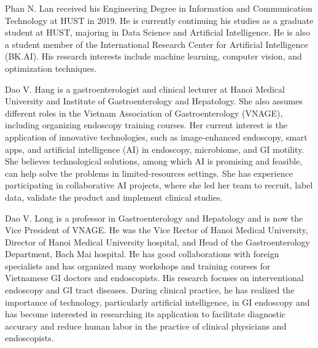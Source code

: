 \documentclass{ieeeaccess}
\begin{document}
\begin{IEEEbiography}{Phan N. Lan} received his Engineering Degree in Information and Communication Technology at HUST in 2019. He is currently continuing his studies as a graduate student at HUST, majoring in Data Science and Artificial Intelligence. He is also a student member of the International Research Center for Artificial Intelligence (BK.AI). His research interests include machine learning, computer vision, and optimization techniques.
    
\end{IEEEbiography}

\begin{IEEEbiography}{Dao V. Hang} is a gastroenterologist and clinical lecturer at Hanoi Medical University and Institute of Gastroenterology and Hepatology. She also assumes different roles in the Vietnam Association of Gastroenterology (VNAGE), including organizing endoscopy training courses. Her current interest is the application of innovative technologies, such as image-enhanced endoscopy, smart apps, and artificial intelligence (AI) in endoscopy, microbiome, and GI motility. She believes technological solutions, among which AI is promising and feasible, can help solve the problems in limited-resources settings. She has experience participating in collaborative AI projects, where she led her team to recruit, label data, validate the product and implement clinical studies.
\end{IEEEbiography}

\begin{IEEEbiography}{Dao V. Long} is a professor in Gastroenterology and Hepatology and is now the Vice President of VNAGE. He was the Vice Rector of Hanoi Medical University, Director of Hanoi Medical University hospital, and Head of the Gastroenterology Department, Bach Mai hospital. He has good collaborations with foreign specialists and has organized many workshops and training courses for Vietnamese GI doctors and endoscopists. His research focuses on interventional endoscopy and GI tract diseases. During clinical practice, he has realized the importance of technology, particularly artificial intelligence, in GI endoscopy and has become interested in researching its application to facilitate diagnostic accuracy and reduce human labor in the practice of clinical physicians and endoscopists.
    
\end{IEEEbiography}
\end{document}
